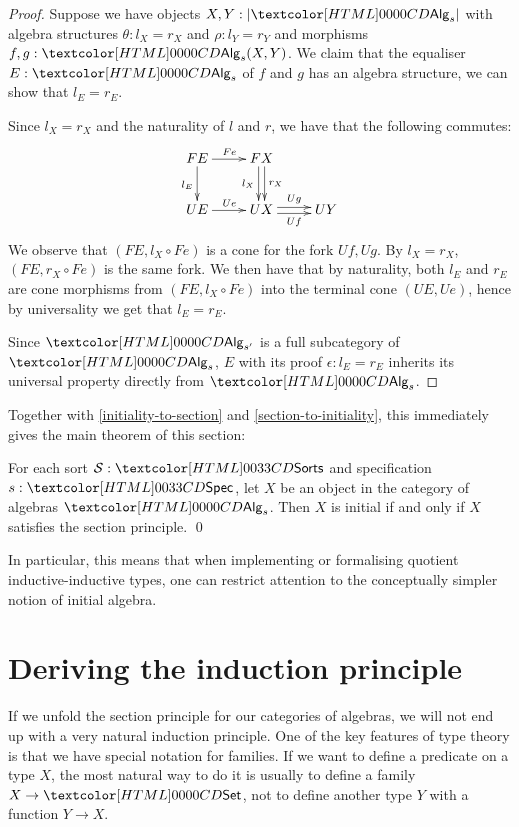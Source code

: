 \begin{proof}
  Suppose we have objects $X, Y : | \Alg_s |$ with algebra structures
  $\theta : l_X = r_X$ and $\rho : l_Y = r_Y$ and morphisms
  $f, g : \Alg_s(X,Y)$. We claim that the equaliser $E : \Alg_s$ of
  $f$ and $g$ has an algebra structure, \ie we can show that
  $l_E = r_E$.

  Since $l_X = r_X$ and the naturality of $l$ and $r$, we have that
  the following commutes:
  $$
  \xymatrix{
    FE \ar[r]^{Fe} \ar[d]_{l_E} &FX \ar@<-.5ex>[d]_-{l_X} \ar@<.5ex>[d]^-{r_X} \\
    UE \ar[r]^{Ue} &UX \ar@<-.5ex>[r]_-{Uf} \ar@<.5ex>[r]^-{Ug} &UY
  }
  $$
  We observe that $(FE, l_X \circ Fe)$ is a cone for the fork
  $Uf,Ug$. By $l_X = r_X$, $(FE, r_X \circ Fe)$ is the same fork. We
  then have that by naturality, both $l_E$ and $r_E$ are cone
  morphisms from $(FE, l_X \circ Fe)$ into the terminal cone
  $(UE,Ue)$, hence by universality we get that $l_E = r_E$.

  Since $\Alg_{s'}$ is a full subcategory of $\Alg_s$, $E$ with its
  proof $\epsilon : l_E = r_E$ inherits its universal property
  directly from $\Alg_s$.
\end{proof}

Together with \cref{initiality-to-section} and
\cref{section-to-initiality}, this immediately gives the main theorem
of this section:

\begin{theorem}
\label{thm:main}
  For each sort $\Ss : \sortsty$ and specification $s : \specty$, let $X$
  be an object in the category of algebras $\Alg_s$. Then $X$ is
  initial if and only if $X$ satisfies the section principle. \qed
\end{theorem}

In particular, this means that when implementing or formalising
quotient inductive-inductive types, one can restrict attention to the
conceptually simpler notion of initial algebra.

\section{Deriving the induction principle}

If we unfold the section principle for our categories of algebras, we
will not end up with a very natural induction principle. One of the
key features of type theory is that we have special notation for
families. If we want to define a predicate on a type $X$, the most 
natural way to do it is usually to define a family $X \to \Set$, not
to define another type $Y$ with a function $Y \to X$. 

